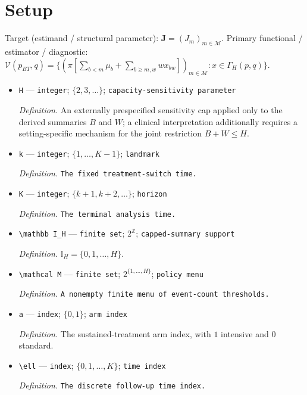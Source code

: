 \documentclass{article}
\begin{document}
\section{Setup}

Target (estimand / structural parameter): \(\mathbf J=(J_m)_{m\in\mathcal M}\).
Primary functional / estimator / diagnostic: \(\mathcal V(p_{BT},q)=\{(\pi[\sum_{b<m}\mu_b+\sum_{b\ge m,w}w x_{bw}])_{m\in\mathcal M}:x\in\Gamma_H(p,q)\}\).
\begin{itemize}
  \item \texttt{H} --- \texttt{integer}; \(\{2,3,\ldots\}\); \texttt{capacity-\allowbreak{}sensitivity parameter}
  \par\smallskip\noindent\emph{Definition.} An externally prespecified sensitivity cap applied only to the derived summaries \(B\) and \(W\); a clinical interpretation additionally requires a setting-specific mechanism for the joint restriction \(B+W\le H\).
  \item \texttt{k} --- \texttt{integer}; \(\{1,\ldots,K-1\}\); \texttt{landmark}
  \par\smallskip\noindent\emph{Definition.} \texttt{The fixed treatment-\allowbreak{}switch time.}
  \item \texttt{K} --- \texttt{integer}; \(\{k+1,k+2,\ldots\}\); \texttt{horizon}
  \par\smallskip\noindent\emph{Definition.} \texttt{The terminal analysis time.}
  \item \texttt{\textbackslash{}\allowbreak{}mathbb I\_\allowbreak{}H} --- \texttt{finite set}; \(2^{\mathbb Z}\); \texttt{capped-\allowbreak{}summary support}
  \par\smallskip\noindent\emph{Definition.} \(\mathbb I_H=\{0,1,\ldots,H\}\).
  \item \texttt{\textbackslash{}\allowbreak{}mathcal M} --- \texttt{finite set}; \(2^{\{1,\ldots,H\}}\); \texttt{policy menu}
  \par\smallskip\noindent\emph{Definition.} \texttt{A nonempty finite menu of event-\allowbreak{}count thresholds.}
  \item \texttt{a} --- \texttt{index}; \(\{0,1\}\); \texttt{arm index}
  \par\smallskip\noindent\emph{Definition.} The sustained-treatment arm index, with \(1\) intensive and \(0\) standard.
  \item \texttt{\textbackslash{}\allowbreak{}ell} --- \texttt{index}; \(\{0,1,\ldots,K\}\); \texttt{time index}
  \par\smallskip\noindent\emph{Definition.} \texttt{The discrete follow-\allowbreak{}up time index.}

\end{itemize}
\end{document}
